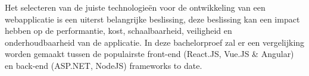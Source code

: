 
%
%
%
%
%

%



Het selecteren van de juiste technologieën voor de ontwikkeling van een
webapplicatie is een uiterst belangrijke beslissing, deze beslissing kan een
impact hebben op de performantie, kost, schaalbaarheid, veiligheid en
onderhoudbaarheid van de applicatie. In deze bachelorproef zal er een
vergelijking worden gemaakt tussen de populairste front-end (React.JS, Vue.JS &
Angular) en back-end (ASP.NET, NodeJS) frameworks to date.

\chapter*{}

\lipsum[1-4]

